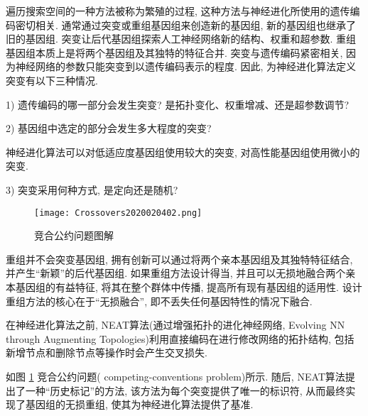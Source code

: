 \begin{remark}
    遍历搜索空间的一种方法被称为繁殖的过程, 这种方法与神经进化所使用的遗传编码密切相关.
    通常通过突变或重组基因组来创造新的基因组, 新的基因组也继承了旧的基因组.
    突变让后代基因组探索人工神经网络新的结构、权重和超参数. 重组基因组本质上是将两个基因组及其独特的特征合并.
突变与遗传编码紧密相关, 因为神经网络的参数只能突变到以遗传编码表示的程度. 因此, 为神经进化算法定义突变有以下三种情况.

1) 遗传编码的哪一部分会发生突变? 是拓扑变化、权重增减、还是超参数调节?

2) 基因组中选定的部分会发生多大程度的突变?
\begin{example}
    神经进化算法可以对低适应度基因组使用较大的突变, 对高性能基因组使用微小的突变.
\end{example}

3) 突变采用何种方式, 是定向还是随机?
\begin{figure}[H]
    \centering
    \texttt{[image: Crossovers2020020402.png]}
    \caption{竞合公约问题图解}
    \label{Crossovers2020020402}
\end{figure}

重组并不会突变基因组, 拥有创新可以通过将两个亲本基因组及其独特特征结合, 并产生“新颖”的后代基因组.
如果重组方法设计得当, 并且可以无损地融合两个亲本基因组的有益特征, 将其在整个群体中传播, 提高所有现有基因组的适用性.
设计重组方法的核心在于“无损融合”, 即不丢失任何基因特性的情况下融合.
\begin{example}
    在神经进化算法之前, NEAT算法(通过增强拓扑的进化神经网络, Evolving NN through Augmenting Topologies)利用直接编码在进行修改网络的拓扑结构, 包括新增节点和删除节点等操作时会产生交叉损失.
\end{example}

如图 \ref{Crossovers2020020402} 竞合公约问题( competing-conventions problem)所示.
随后, NEAT算法提出了一种“历史标记”的方法, 该方法为每个突变提供了唯一的标识符, 从而最终实现了基因组的无损重组, 使其为神经进化算法提供了基准.
\end{remark}

